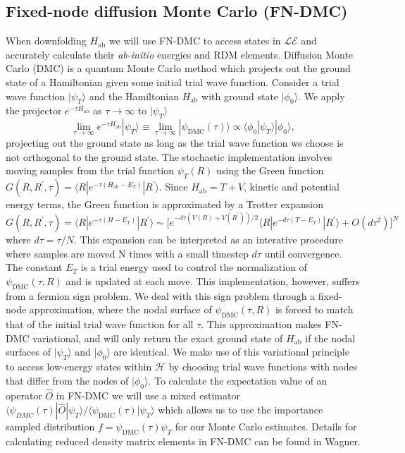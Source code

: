 \documentclass{article}
\begin{document}
\subsection{Fixed-node diffusion Monte Carlo (FN-DMC)}
When downfolding $H_\text{ab}$ we will use FN-DMC to access states in $\mathcal{LE}$ and accurately calculate their \textit{ab-initio} energies and RDM elements.
Diffusion Monte Carlo (DMC) is a quantum Monte Carlo method which projects out the ground state of a Hamiltonian given some initial trial wave function.
Consider a trial wave function $|\psi_T\rangle$ and the Hamiltonian $H_\text{ab}$ with ground state $|\phi_0\rangle$. We apply the projector $e^{-\tau H_\text{ab}}$ as $\tau \rightarrow \infty$ to $|\psi_T \rangle$
\begin{equation}
\lim_{\tau \rightarrow \infty} e^{-\tau H_\text{ab}} |\psi_T\rangle 
\equiv \lim_{\tau \rightarrow \infty} |\psi_\text{DMC}(\tau)\rangle \propto \langle \phi_0|\psi_T\rangle |\phi_0\rangle,
\end{equation}
projecting out the ground state as long as the trial wave function we choose is not orthogonal to the ground state. 
The stochastic implementation involves moving samples from the trial function $\psi_T(R)$ using the Green function $G(R, R^\prime, \tau) = \langle R | e^{-\tau(H_\text{ab} - E_T)} | R^\prime \rangle$. Since $H_\text{ab} = T + V$, kinetic and potential energy terms, the Green function is approximated by a Trotter expansion $G(R, R^\prime, \tau) = \langle R | e^{-\tau(H - E_T)} | R^\prime \rangle \sim \Big[e^{-d\tau(V(R) + V(R^\prime))/2} \langle R| e^{-d\tau(T - E_T)}|R^\prime \rangle + O(d\tau^2) \Big]^N $ where $d\tau = \tau/N$.
This expansion can be interpreted as an interative procedure where samples are moved N times with a small timestep $d\tau$ until convergence.
The constant $E_T$ is a trial energy used to control the normalization of $\psi_\text{DMC}(\tau, R)$ and is updated at each move.
This implementation, however, suffers from a fermion sign problem. 
We deal with this sign problem through a fixed-node approximation, where the nodal surface of $\psi_\text{DMC}(\tau, R)$ is forced to match that of the initial trial wave function for all $\tau$.
This approximation makes FN-DMC variational, and will only return the exact ground state of $H_\text{ab}$ if the nodal surfaces of $|\psi_T\rangle$ and $|\phi_0\rangle$ are identical.
We make use of this variational principle to access low-energy states within $\mathcal{H}$ by choosing trial wave functions with nodes that differ from the nodes of $|\phi_0 \rangle$.
To calculate the expectation value of an operator $\hat{O}$ in FN-DMC we will use a mixed estimator $\langle \psi_{DMC}(\tau) |\hat{O} | \psi_T \rangle/\langle \psi_\text{DMC}(\tau) | \psi_T \rangle$ which allows us to use the importance sampled distribution $f = \psi_\text{DMC}(\tau)\psi_T$ for our Monte Carlo estimates.
Details for calculating reduced density matrix elements in FN-DMC can be found in Wagner.
\end{document}
